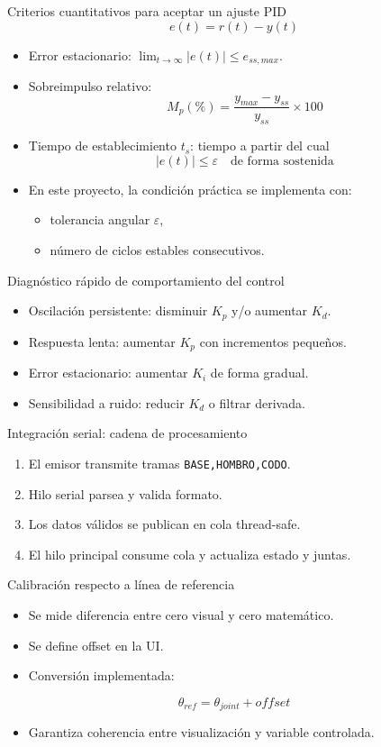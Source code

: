 \documentclass[aspectratio=169]{beamer}
\begin{document}
\begin{frame}{Criterios cuantitativos para aceptar un ajuste PID}
\[
e(t)=r(t)-y(t)
\]
\begin{itemize}
  \item Error estacionario: $\lim_{t\to\infty}|e(t)| \leq e_{ss,max}$.
  \item Sobreimpulso relativo:
\[
M_p(\%)=\frac{y_{max}-y_{ss}}{y_{ss}}\times 100
\]
  \item Tiempo de establecimiento $t_s$: tiempo a partir del cual
\[
|e(t)|\leq \varepsilon \quad \text{de forma sostenida}
\]
  \item En este proyecto, la condición práctica se implementa con:
  \begin{itemize}
    \item tolerancia angular $\varepsilon$,
    \item número de ciclos estables consecutivos.
  \end{itemize}
\end{itemize}
\end{frame}

\begin{frame}{Diagnóstico rápido de comportamiento del control}
\begin{itemize}
  \item Oscilación persistente: disminuir $K_p$ y/o aumentar $K_d$.
  \item Respuesta lenta: aumentar $K_p$ con incrementos pequeños.
  \item Error estacionario: aumentar $K_i$ de forma gradual.
  \item Sensibilidad a ruido: reducir $K_d$ o filtrar derivada.
\end{itemize}
\end{frame}

\begin{frame}{Integración serial: cadena de procesamiento}
\begin{enumerate}
  \item El emisor transmite tramas \texttt{BASE,HOMBRO,CODO}.
  \item Hilo serial parsea y valida formato.
  \item Los datos válidos se publican en cola thread-safe.
  \item El hilo principal consume cola y actualiza estado y juntas.
\end{enumerate}
\end{frame}

\begin{frame}{Calibración respecto a línea de referencia}
\begin{itemize}
  \item Se mide diferencia entre cero visual y cero matemático.
  \item Se define offset en la UI.
  \item Conversión implementada:
\end{itemize}
\[
\theta_{ref}=\theta_{joint}+offset
\]
\begin{itemize}
  \item Garantiza coherencia entre visualización y variable controlada.
\end{itemize}
\end{frame}
\end{document}
